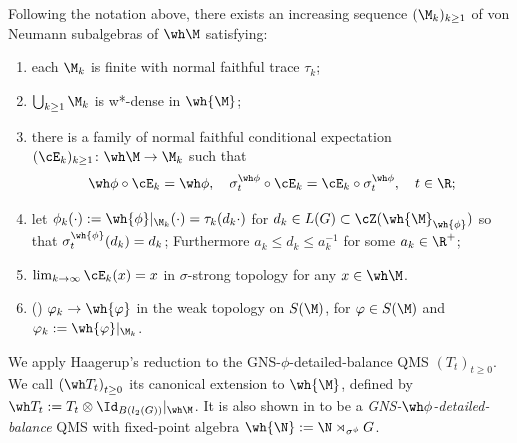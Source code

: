 \documentclass[sn-mathphys-num]{sn-jnl}
\begin{document}
\begin{theorem}\label{thm:haagerup}
  Following the notation above, there exists an increasing sequence $(\M_k)_{k\ge1}$ of von Neumann subalgebras of $\wh\M$ satisfying:
  \begin{enumerate}[label=(\roman*)]
    \item each $\M_k$ is finite with normal faithful trace $\tau_k$;
    \item $\bigcup_{k\ge1}\M_k$ is w*-dense in $\wh{\M}$;
    \item there is a family of normal faithful conditional expectation $(\cE_k)_{k\ge1} \colon \wh\M  \to \M_k$
    such that
    \[
      \wh\phi\circ\cE_k = \wh\phi,
      \quad
      \sigma_t^{\wh\phi}\circ\cE_k = \cE_k\circ\sigma_t^{\wh\phi},
      \quad
      t\in\R;
    \]
    \item let $\phi_k(\cdot):=\wh{\phi}|_{\M_k}(\cdot)=\tau_k (d_k\cdot)$ for $d_k\in L(G)\subset \cZ(\wh{\M}_{\wh{\phi}})$ so that $\sigma_t^{\wh{\phi}}(d_k)=d_k$; Furthermore $a_k\le d_k\le a_k^{-1}$ for some $a_k\in\R^+$;
    \item $\lim_{k\to\infty}\cE_k(x)=x$ in $\sigma$-strong topology for any $x\in\wh\M$.
    \item (\cite[Section~4.2]{Gao_Junge_LaRacuente_Li_2025}) $\varphi_k \to \wh{\varphi}$ in the weak topology on $S(\M)$, for $\varphi\in S(\M)$ and $\varphi_k:=\wh{\varphi}|_{\M_k}$.
  \end{enumerate}
\end{theorem}


We apply Haagerup's reduction  to the GNS-$\phi$-detailed-balance QMS $(T_t)_{t\ge0}$. We call ${(\wh T_t)}_{t\ge0}$ its canonical extension to $\wh{\M}$, defined by $\wh T_t:=T_t\otimes\Id_{B(l_2(G))}|_{\wh \M}$. It is also shown in \cite[Section~4.2]{Gao_Junge_LaRacuente_Li_2025} to be a \emph{GNS-$\wh\phi$-detailed-balance} QMS with fixed-point algebra $\wh{\N}:=\N \rtimes_{\sigma^\phi}G$.
\end{document}
